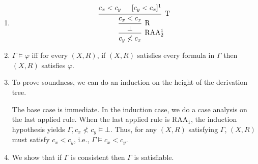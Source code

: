 \documentclass[a4paper]{article}
\begin{document}
\section{}
\begin{enumerate}
\item
  \[\begin{prooftree}
      \hypo{c_{x} < c_{y}}
      \hypo{[c_{y} < c_{x}]^1}
      \infer2[T]{c_{x} < c_{x}}
      \infer1[R]{\bot}
      \infer1[RAA$_{2}^1$]{c_{y} \nless c_{x}}
    \end{prooftree}\]
\item
  $\Gamma \vDash \varphi$ iff for every $(X,R)$, if $(X,R)$ satisfies every formula in $\Gamma$ then $(X,R)$ satisfies $\varphi$.
\item To prove soundness, we can do an induction on the height of the derivation tree.
  
  The base case is immediate.
  In the induction case, we do a case analysis on the last applied rule.
  When the last applied rule is $\text{RAA}_{1}$, the induction hypothesis yields $\Gamma,c_{x} \nless c_{y} \vDash \bot$.
  Thus, for any $(X,R)$ satisfying $\Gamma$, $(X,R)$ must satisfy $c_{x} < c_{y}$, i.e., $\Gamma \vDash c_{x} < c_{y}$.
\item We show that if $\Gamma$ is consistent then $\Gamma$ is satisfiable.
\end{enumerate}

\end{document}
